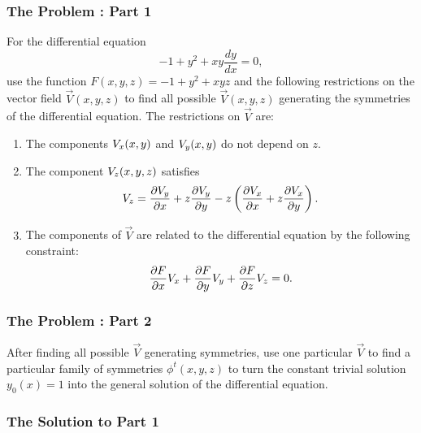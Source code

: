 \subsubsection*{The Problem : Part 1}
For the differential equation
\begin{equation}
-1 + y^2 + xy\frac{dy}{dx} = 0,
\end{equation}
use the function \(F(x,y,z) = -1 + y^2 + xyz\) and the following restrictions on the vector 
field \(\vec V(x,y,z)\) to find all possible \(\vec V(x,y,z)\) generating the symmetries of the differential
equation. The restrictions on \(\vec V\) are:
\begin{enumerate}
\item The components \(V_x(x,y)\) and \(V_y(x,y)\) do not depend on \(z\). 
\item The component \(V_z(x,y,z)\) satisfies
\begin{equation}
V_z =  \frac{\partial V_y}{\partial x} + z \frac{\partial V_y}{\partial y} 
        - z\left( \frac{\partial V_x}{\partial x} + z \frac{\partial V_x}{\partial y}\right).
\end{equation}
\item The components of \(\vec V\) are related to the differential equation by the following constraint: 
\begin{equation}
\frac{\partial F}{\partial x}V_x + \frac{\partial F}{\partial y}V_y +  \frac{\partial F}{\partial z} V_z = 0.
\end{equation} 
\end{enumerate}

\subsubsection*{The Problem : Part 2}

After finding all possible \(\vec V\) generating symmetries, use one particular \(\vec V\) to find a particular
family of symmetries \(\phi^t (x,y,z)\) to turn the constant trivial solution \(y_0(x) = 1\) into
the general solution of the differential equation.

\subsubsection*{The Solution to Part 1}

